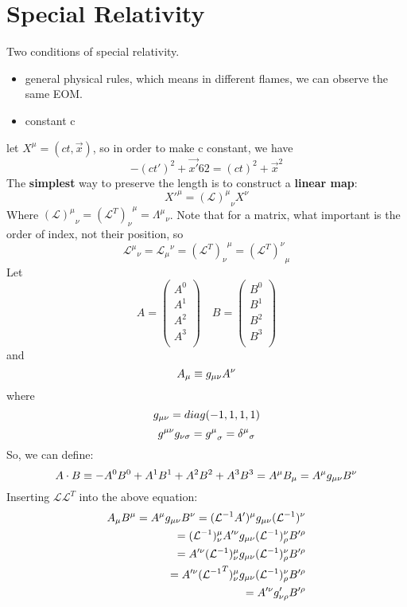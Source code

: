 \newcommand{\SR}{special relativity}
\section{Special Relativity}
Two conditions of \SR{}. 
\begin{itemize}
    \item general physical rules, which means in different flames, we can 
	observe the same EOM.
    \item constant c
\end{itemize}
let $X^\mu=(ct, \vec{x})$, so in order to make c constant, we have
\[
    -(ct')^2+\vec{x'}62 = (ct)^2 +\vec{x}^2
\]
The \textbf{simplest} way to preserve the length is to construct a \textbf{linear map}:
\[
    X'^\mu = {(\mathcal{L})^\mu}_{\nu}X^\nu
\]
Where ${(\mathcal{L})^\mu}_{\nu} = {(\mathcal{L}^T)_\nu}^{\mu} = {\Lambda^\mu}_\nu$.
Note that for a matrix, what important is the order of index, not their position, so
\[
    {\mathcal{L}^{\mu}}_{\nu}={\mathcal{L}_{\mu}}^{\nu}={(\mathcal{L}^T)_{\nu}}^{\mu}={(\mathcal{L}^T)^{\nu}}_{\mu}
\]
Let 
\[
    A = \begin{pmatrix}
	A^0 \\
	A^1 \\
	A^2 \\
	A^3 \\
    \end{pmatrix}\quad
    B = \begin{pmatrix}
	B^0 \\
	B^1 \\
	B^2 \\
	B^3 \\
    \end{pmatrix}
\]
and 
\[
    A_\mu  \equiv g_{\mu\nu}A^\nu
\]
where 
\begin{equation}
    g_{\mu\nu} = diag(-1, 1, 1, 1)
\end{equation}
\[
    g^{\mu\nu}g_{\nu\sigma}={g^{\mu}}_\sigma={\delta^{\mu}}_\sigma 
\]
So, we can define:
\[
    A\cdot B \equiv -A^0B^0 + A^1B^1 + A^2B^2 + A^3B^3 = A^\mu B_\mu = A^\mu g_{\mu\nu}B^\nu
\]
Inserting $\mathcal{L}\mathcal{L}^T$ into the above equation:
\[
    \begin{aligned}
	A_\mu B^\mu= A^\mu g_{\mu\nu}B^\nu = (\mathcal{L}^{-1}A')^{\mu}g_{\mu\nu}(\mathcal{L}^{-1})^\nu \\
	= (\mathcal{L}^{-1})^\mu_{\nu}A'^{\nu}g_{\mu\nu}(\mathcal{L}^{-1})^\nu_{\rho}B'^\rho    \\
	= A'^{\nu}(\mathcal{L}^{-1})^\mu_{\nu}g_{\mu\nu}(\mathcal{L}^{-1})^\nu_{\rho}B'^\rho    \\
	= A'^{\nu}({\mathcal{L}^{-1}}^T)_\nu^{\mu}g_{\mu\nu}(\mathcal{L}^{-1})^\nu_{\rho}B'^\rho    \\
	= A'^{\nu}g'_{\nu\rho}B'^\rho
    \end{aligned}
\]
